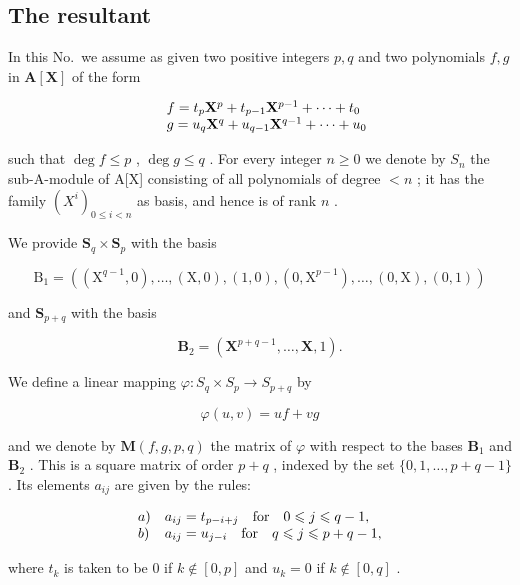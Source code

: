 \subsection{The resultant}

In this No.~we assume as given two positive integers \(p, q\) and two polynomials \(f, g\) in \(\mathbf{A}[\mathbf{X}]\) of the form

\[
\begin{array}{r l} & {f = t _ {p} \mathbf {X} ^ {p} + t _ {p - 1} \mathbf {X} ^ {p - 1} + \dots + t _ {0}} \\ & {g = u _ {q} \mathbf {X} ^ {q} + u _ {q - 1} \mathbf {X} ^ {q - 1} + \dots + u _ {0}} \end{array}
\]

such that \(\deg f \leqslant p\) , \(\deg g \leqslant q\) . For every integer \(n \geqslant 0\) we denote by \(S_n\) the sub-A-module of A{[}X{]} consisting of all polynomials of degree \(< n\) ; it has the family \((X^i)_{0 \leqslant i < n}\) as basis, and hence is of rank \(n\) .

We provide \(\mathbf{S}_q\times \mathbf{S}_p\) with the basis

\[
\mathrm{B} _ {1} = \left(\left(\mathrm{X} ^ {q - 1}, 0\right), \dots , (\mathrm{X}, 0), (1, 0), \left(0, \mathrm{X} ^ {p - 1}\right), \dots , (0, \mathrm{X}), (0, 1)\right)
\]

and \(\mathbf{S}_{p + q}\) with the basis

\[
\mathbf {B} _ {2} = \left(\mathbf {X} ^ {p + q - 1}, \dots , \mathbf {X}, 1\right).
\]

We define a linear mapping \(\varphi : S_q \times S_p \to S_{p + q}\) by

\[
\varphi (u, v) = u f + v g
\]

and we denote by \(\mathbf{M}(f,g,p,q)\) the matrix of \(\varphi\) with respect to the bases \(\mathbf{B}_1\) and \(\mathbf{B}_2\) . This is a square matrix of order \(p + q\) , indexed by the set \(\{0,1,\dots,p + q - 1\}\) . Its elements \(a_{ij}\) are given by the rules:

\[
\begin{array}{l l} a) & a _ {i j} = t _ {p - i + j} \quad \text {for} \quad 0 \leqslant j \leqslant q - 1, \\ b) & a _ {i j} = u _ {j - i} \quad \text {for} \quad q \leqslant j \leqslant p + q - 1, \end{array}
\]

where \(t_k\) is taken to be 0 if \(k \notin [0, p]\) and \(u_k = 0\) if \(k \notin [0, q]\) .

